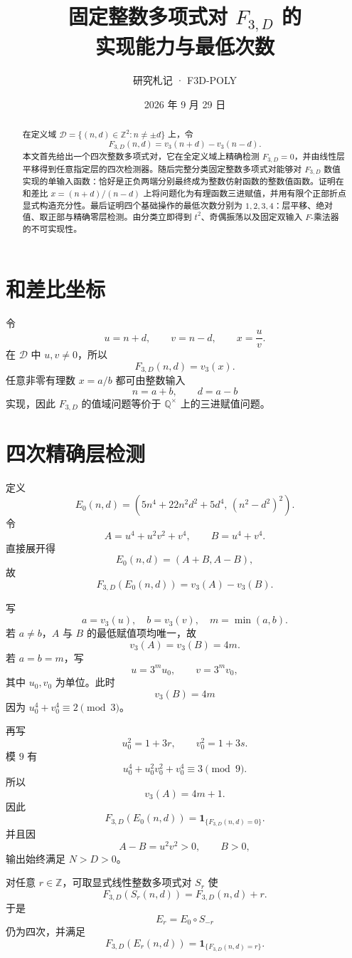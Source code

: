 \documentclass[11pt,a4paper]{ctexart}
\title{\bfseries 固定整数多项式对 \(F_{3,D}\) 的\\实现能力与最低次数}
\author{研究札记 · F3D-POLY}
\date{2026 年 9 月 29 日}
\newcommand{\F}{F_{3,D}}
\begin{document}
\maketitle

\begin{abstract}
在定义域 \(\mathcal D=\{(n,d)\in\mathbb Z^2:n\ne\pm d\}\) 上，令
\[
F_{3,D}(n,d)=v_3(n+d)-v_3(n-d).
\]
本文首先给出一个四次整数多项式对，它在全定义域上精确检测 \(F_{3,D}=0\)，并由线性层平移得到任意指定层的四次检测器。随后完整分类固定整数多项式对能够对 \(F_{3,D}\) 数值实现的单输入函数：恰好是正负两端分别最终成为整数仿射函数的整数值函数。证明在和差比 \(x=(n+d)/(n-d)\) 上将问题化为有理函数三进赋值，并用有限个正部折点显式构造充分性。最后证明四个基础操作的最低次数分别为 \(1,2,3,4\)：层平移、绝对值、取正部与精确零层检测。由分类立即得到 \(t^2\)、奇偶振荡以及固定双输入 \(F\)-乘法器的不可实现性。
\end{abstract}

\section{和差比坐标}
令
\[
u=n+d,\qquad v=n-d,\qquad x=\frac uv.
\]
在 \(\mathcal D\) 中 \(u,v\ne0\)，所以
\[
\boxed{\F(n,d)=v_3(x).}
\]
任意非零有理数 \(x=a/b\) 都可由整数输入
\[
n=a+b,\qquad d=a-b
\]
实现，因此 \(F_{3,D}\) 的值域问题等价于 \(\mathbb Q^\times\) 上的三进赋值问题。

\section{四次精确层检测}
定义
\[
E_0(n,d)=
\left(
5n^4+22n^2d^2+5d^4,\,
(n^2-d^2)^2
\right).
\]
令
\[
A=u^4+u^2v^2+v^4,\qquad B=u^4+v^4.
\]
直接展开得
\[
E_0(n,d)=(A+B,A-B),
\]
故
\[
\F(E_0(n,d))=v_3(A)-v_3(B).
\]

写
\[
a=v_3(u),\quad b=v_3(v),\quad m=\min(a,b).
\]
若 \(a\ne b\)，\(A\) 与 \(B\) 的最低赋值项均唯一，故
\[
v_3(A)=v_3(B)=4m.
\]
若 \(a=b=m\)，写
\[
u=3^mu_0,\qquad v=3^mv_0,
\]
其中 \(u_0,v_0\) 为单位。此时
\[
v_3(B)=4m
\]
因为 \(u_0^4+v_0^4\equiv2\pmod3\)。

再写
\[
u_0^2=1+3r,\qquad v_0^2=1+3s.
\]
模 \(9\) 有
\[
u_0^4+u_0^2v_0^2+v_0^4
\equiv3\pmod9.
\]
所以
\[
v_3(A)=4m+1.
\]
因此
\[
\boxed{
\F(E_0(n,d))
=
\mathbf1_{\{\F(n,d)=0\}}.
}
\]
并且因
\[
A-B=u^2v^2>0,\qquad B>0,
\]
输出始终满足 \(N>D>0\)。

对任意 \(r\in\mathbb Z\)，可取显式线性整数多项式对 \(S_r\) 使
\[
\F(S_r(n,d))=\F(n,d)+r.
\]
于是
\[
E_r=E_0\circ S_{-r}
\]
仍为四次，并满足
\[
\boxed{
\F(E_r(n,d))
=
\mathbf1_{\{\F(n,d)=r\}}.
}
\]
\end{document}
